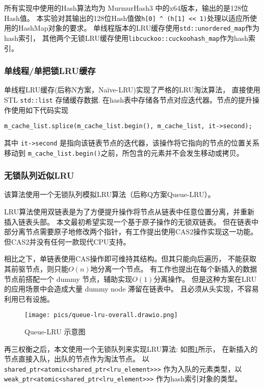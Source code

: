 所有实现中使用的Hash算法均为 MurmurHash3 中的x64版本，输出的是128位Hash值。
本实验对其输出的128位Hash值做\verb|h[0] ^ (h[1] << 1)|处理以适应所使用的HashMap对象的要求。
单线程版本的LRU缓存使用\verb|std::unordered_map|作为hash索引，
其他两个无锁LRU缓存使用\verb|libcuckoo::cuckoohash_map|作为hash索引。

\subsubsection{单线程/单把锁LRU缓存}

单线程LRU缓存(后称N方案，Na\"{i}ve-LRU)实现了严格的LRU淘汰算法，
直接使用STL \verb|std::list| 存储缓存数据.
在hash表中存储各节点对应迭代器。节点的提升操作使用如下代码实现 
\begin{verbatim}
m_cache_list.splice(m_cache_list.begin(), m_cache_list, it->second);
\end{verbatim}
其中 \verb|it->second| 是指向该链表节点的迭代器，该操作将它指向的节点的位置关系移动到
\verb|m_cache_list.begin()|之前，所包含的元素并不会发生移动或拷贝。

\subsubsection{无锁队列近似LRU}

该算法使用一个无锁队列模拟LRU算法（后称Q方案Queue-LRU）。

LRU算法使用双链表是为了方便提升操作将节点从链表中任意位置分离，并重新插入链表头部。
本文最初希望实现一个基于原子操作的无锁双链表。
但在链表中部分离节点需要原子地修改两个指针，有工作提出使用CAS2操作实现这一功能。
但CAS2并没有任何一款现代CPU支持。

相比之下，单链表使用CAS操作即可维持其结构。但其只能向后遍历，
不能获取其前驱节点，则只能$O(n)$地分离一个节点。
有工作也提出在每个新插入的数据节点前搭配一个 dummy 节点，辅助实现$O(1)$分离操作。
但是这种方案在LRU的应用场景中会造成大量 dummy node 滞留在链表中。
且必须从头实现，不容易利用已有设施。

\begin{figure}[b]
    \centering
    \texttt{[image: pics/queue-lru-overall.drawio.png]}
    \caption{Queue-LRU 示意图}
    \label{fig:queue-lru-overall}
\end{figure}

再三权衡之后，本文使用一个无锁队列来实现LRU算法:
如图\ref{fig:queue-lru-overall}所示，
在新插入的节点直接入队，出队的节点作为淘汰节点。
以
\verb|shared_ptr<atomic<shared_ptr<lru_element>>>|
作为入队的元素类型，以
\verb|weak_ptr<atomic<shared_ptr<lru_element>>>|
作为hash索引对象的类型。

